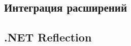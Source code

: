 \subsection{Интеграция расширений}
\label{sec:extention_interaction}

\subsection{.NET Reflection}


\pagebreak
